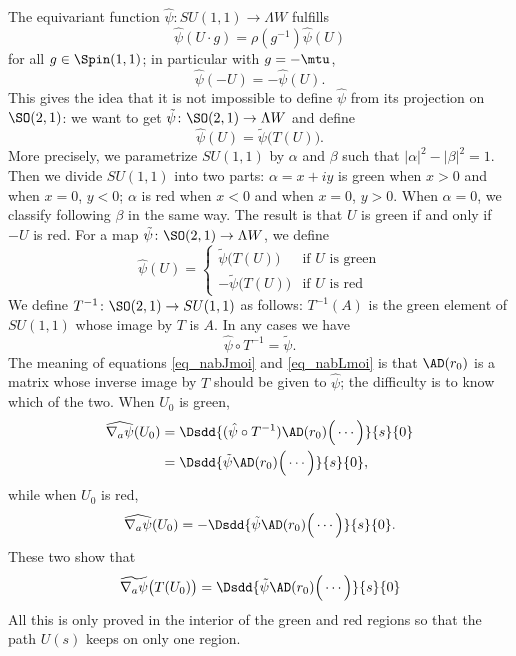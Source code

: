 The equivariant function $\hat{\psi}\colon SU(1,1)\to \Lambda W$ fulfills
\[
	\hat{\psi}(U\cdot g)=\rho(g^{-1})\hat{\psi}(U)
\]
for all $g\in\Spin(1,1)$; in particular with $g=-\mtu$,
\begin{equation}
	\hat{\psi}(-U)=-\hat{\psi}(U).
\end{equation}
This gives the idea that it is not impossible to define $\hat{\psi}$ from its projection on $\SO(2,1)$: we want to get $\tilde{\psi}\colon \SO(2,1)\to \Lambda W$ and define
\[
	\hat{\psi}(U)=\tilde{\psi}\big( T(U) \big).
\]
More precisely, we parametrize $SU(1,1)$ by $\alpha$ and $\beta$ such that $| \alpha |^2-| \beta |^2=1$. Then we divide $SU(1,1)$ into two parts: $\alpha=x+iy$ is green when $x>0$ and when $x=0$, $y<0$; $\alpha$ is red when $x<0$ and when $x=0$, $y>0$. When $\alpha=0$, we classify following $\beta$ in the same way. The result is that $U$ is green if and only if $-U$ is red. For a map $\tilde{\psi}\colon \SO(2,1)\to \Lambda W$, we define
\begin{equation}
	\hat{\psi}(U)=
	\begin{cases}
		\tilde{\psi}\big( T(U) \big) & \text{if }U \text{ is green} \\
		-\tilde{\psi}\big(T(U)\big)  & \text{if }U \text{ is red}
	\end{cases}
\end{equation}
We define $T^{-1}\colon \SO(2,1)\to SU(1,1)$ as follows: $T^{-1}(A)$ is the green element of $SU(1,1)$ whose image by $T$ is $A$. In any cases we have
\[
	\hat{\psi}\circ T^{-1}=\tilde{\psi}.
\]
The meaning of equations \eqref{eq_nabJmoi} and \eqref{eq_nabLmoi} is that $\AD(r_0)$ is a matrix whose inverse image by $T$ should be given to $\hat{\psi}$; the difficulty is to know which of the two. When $U_0$ is green,
\[
	\begin{split}
		\widehat{\nabla_a\psi}(U_0)&=\Dsdd{ (\hat{\psi}\circ T^{-1})  \AD(r_0)\Big( \cdots \Big)   }{s}{0} \\
		&=\Dsdd{ \tilde{\psi} \AD(r_0)\Big( \cdots \Big)}{s}{0},
	\end{split}
\]
while when $U_0$ is red,
\[
	\widehat{\nabla_a\psi}(U_0)=-\Dsdd{ \tilde{\psi}\AD(r_0)\Big( \cdots \Big) }{s}{0}.
\]
These two show that
\begin{equation}
	\widetilde{\nabla_a\psi}\big( T(U_0) \big)=\Dsdd{   \tilde{\psi}\AD(r_0)\Big( \cdots \Big)    }{s}{0}
\end{equation}
All this is only proved in the interior of the green and red regions so that the path $U(s)$ keeps on only one region.

